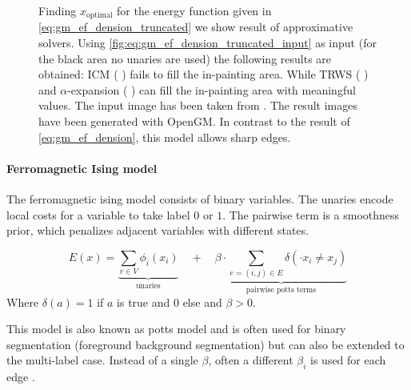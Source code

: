 \begin{figure}[H]
{    }
    \caption[Energy based truncated denoising]{
        Finding $x_{\text{optimal}} $ for the energy function given
        in \cref{eq:gm_ef_dension_truncated} we show result of approximative solvers.
        Using \cref{fig:eq:gm_ef_dension_truncated_input} as input (for the black area no unaries 
        are used)
        the following
        results are obtained: ICM \citep{besag_1986_icm}  ( ) fails
        to fill the in-painting area. While TRWS \cite{kolmogorov_2006_pami_trws}  ( ) 
        and $\alpha$-expansion \cite{boykov_2001_pami}  ( ) can fill the in-painting area
        with meaningful values.
        The input image has been taken from \citep{szeliski_2008_pami}.
        The result images have been generated with OpenGM\citep{andres_2012_opengm_arxiv}.
        In contrast to the result of \cref{eq:gm_ef_dension}, this model
        allows sharp edges.
    }\label{fig:gm_ef_dension_truncated}
\end{figure}


\paragraph{Ferromagnetic Ising model}
The ferromagnetic ising model consists 
of binary variables.
The unaries encode local costs for a variable
to take label $0$ or $1$.
The pairwise term is a smoothness prior, which penalizes
adjacent variables with different states.

\begin{equation} \label{eq:gm_ising}
    E(x) = 
    \underbrace{
        \sum_{v \in V} \phi_i(x_i)
    }_{\text{unaries}}
     \quad +  \quad
    \underbrace{
        \beta \cdot \sum_{e=(i,j) \in E }  \delta(\cdot x_i\neq x_j) 
    }_{\text{pairwise potts terms}}
\end{equation}
Where $\delta(a)=1$ if $a$ is true and $0$ else
and $\beta>0$.

This model is also known as potts model and is often
used for binary segmentation (\eg foreground background segmentation)
but can also be extended to the multi-label case.
Instead of a single $\beta$, often a different $\beta_i$ is used
for each edge \citep{szeliski_2008_pami}.



